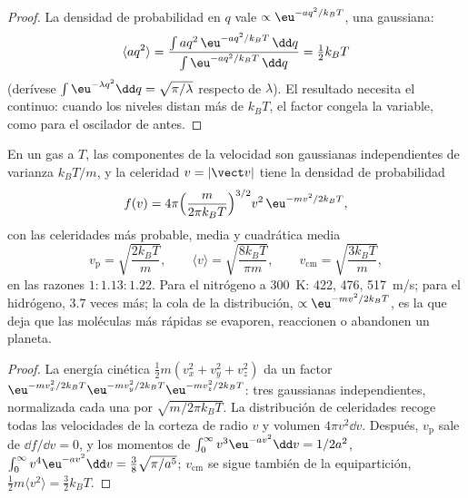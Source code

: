 \begin{proof}
La densidad de probabilidad en $q$ vale $\propto\eu^{-aq^2/k_BT}$, una gaussiana:
\[
\langle aq^2\rangle = \frac{\int aq^2\,\eu^{-aq^2/k_BT}\,\dd q}{\int\eu^{-aq^2/k_BT}\,\dd q} = \tfrac12k_BT
\]
(derívese $\int\eu^{-\lambda q^2}\dd q = \sqrt{\pi/\lambda}$ respecto de
$\lambda$). El resultado necesita el continuo: cuando los
niveles distan más de $k_BT$, el factor congela la variable,
como para el oscilador de antes.
\end{proof}

\begin{theorem}\label{thm:b2:boltzmann-factor:maxwell}
En un gas a $T$, las componentes de la velocidad son gaussianas independientes de
varianza $k_BT/m$, y la celeridad $v = |\vect v|$ tiene la densidad de
probabilidad
\[
f(v) = 4\pi\Big(\frac{m}{2\pi k_BT}\Big)^{3/2}v^2\,\eu^{-mv^2/2k_BT} ,
\]
con las celeridades más probable, media y cuadrática media
\[
v_{\text{p}} = \sqrt{\frac{2k_BT}{m}}, \qquad
\langle v\rangle = \sqrt{\frac{8k_BT}{\pi m}}, \qquad
v_{\text{cm}} = \sqrt{\frac{3k_BT}{m}} ,
\]
en las razones $1 : 1.13 : 1.22$. Para el nitrógeno a \qty{300}{K}: \qty{422}{},
\qty{476}{}, \qty{517}{m/s}; para el hidrógeno, $3.7$ veces más; la
cola de la distribución, $\propto\eu^{-mv^2/2k_BT}$, es la que deja que las
moléculas más rápidas se evaporen, reaccionen o abandonen un planeta.
\end{theorem}

\begin{proof}
La energía cinética $\tfrac12m(v_x^2 + v_y^2 + v_z^2)$ da un factor
$\eu^{-mv_x^2/2k_BT}\eu^{-mv_y^2/2k_BT}\eu^{-mv_z^2/2k_BT}$: tres gaussianas
independientes, normalizada cada una por $\sqrt{m/2\pi k_BT}$. La distribución
de celeridades recoge todas las velocidades de la corteza de radio $v$ y
volumen $4\pi v^2\dd v$. Después, $v_{\text{p}}$ sale de $\dd f/\dd v = 0$, y los
momentos de $\int_0^\infty v^3\eu^{-av^2}\dd v = 1/2a^2$, $\int_0^\infty
v^4\eu^{-av^2}\dd v = \tfrac38\sqrt{\pi/a^5}$; $v_{\text{cm}}$ se sigue también
de la equipartición, $\tfrac12m\langle v^2\rangle = \tfrac32k_BT$.
\end{proof}

